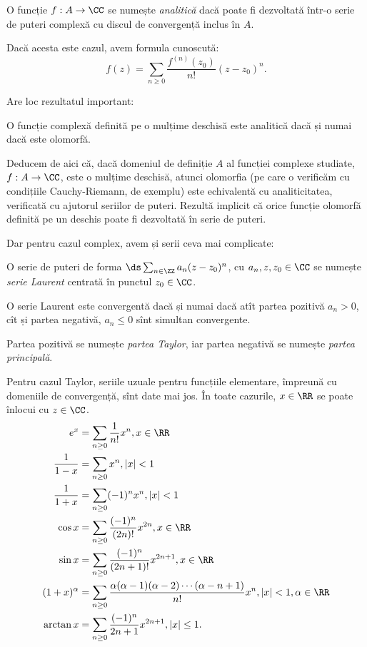 \begin{definition}\label{def:analitica}
  O funcție $ f : A \to \CC $ se numește \emph{analitică} dacă poate fi
  dezvoltată într-o serie de puteri complexă cu discul de convergență
  inclus în $ A $.
\end{definition}

Dacă acesta este cazul, avem formula cunoscută:
\[
  f(z) = \sum_{n \geq 0} \dfrac{f^{(n)}(z_0)}{n!} (z - z_0)^n.
\]

Are loc rezultatul important:
\begin{theorem}\label{thm:wrc}
  O funcție complexă definită pe o mulțime deschisă este analitică dacă și
  numai dacă este olomorfă.
\end{theorem}

Deducem de aici că, dacă domeniul de definiție $ A $ al funcției complexe
studiate, $ f : A \to \CC $, este o mulțime deschisă, atunci olomorfia
(pe care o verificăm cu condițiile Cauchy-Riemann, de exemplu) este echivalentă
cu analiticitatea, verificată cu ajutorul seriilor de puteri. Rezultă
implicit că orice funcție olomorfă definită pe un deschis poate fi dezvoltată
în serie de puteri.

Dar pentru cazul complex, avem și serii ceva mai complicate:
\begin{definition}\label{def:laurent}
  O serie de puteri de forma $ \ds\sum_{n \in \ZZ} a_n(z - z_0)^n $,
  cu $ a_n, z, z_0 \in \CC $ se numește \emph{serie Laurent} centrată în
  punctul $ z_0 \in \CC $.
\end{definition}

O serie Laurent este convergentă dacă și numai dacă atît partea pozitivă
$ a_n > 0 $, cît și partea negativă, $ a_n \leq 0 $ sînt simultan convergente.

Partea pozitivă se numește \emph{partea Taylor}, iar partea negativă se numește
\emph{partea principală}.

Pentru cazul Taylor, seriile uzuale pentru funcțiile elementare, împreună cu domeniile
de convergență, sînt date mai jos. În toate cazurile, $ x \in \RR $ se poate înlocui
cu $ z \in \CC $.
\begin{align*}
  e^x &= \sum_{n \geq 0} \dfrac{1}{n!} x^n, x \in \RR \\
  \dfrac{1}{1 - x} &= \sum_{n \geq 0} x^n, |x| < 1 \\
  \dfrac{1}{1 + x} &= \sum_{n \geq 0} (-1)^n x^n, |x| < 1 \\
  \cos x &= \sum_{n \geq 0} \dfrac{(-1)^n}{(2n)!} x^{2n}, x \in \RR \\
  \sin x &= \sum_{n \geq 0} \dfrac{(-1)^n}{(2n + 1)!} x^{2n + 1}, x \in \RR \\
  (1 + x)^\alpha &= \sum_{n \geq 0} \dfrac{\alpha(\alpha - 1)(\alpha - 2) \cdots (\alpha - n + 1)}{n!} x^n,%
                   |x| < 1, \alpha \in \RR \\
  \arctan x &= \sum_{n \geq 0} \dfrac{(-1)^n}{2n + 1} x^{2n + 1}, | x | \leq 1.
\end{align*}

